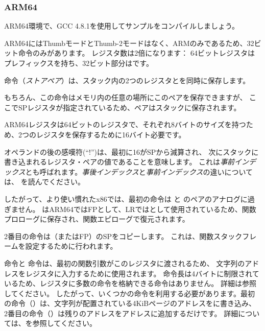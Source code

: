 ﻿\subsubsection{ARM64}


ARM64環境で、GCC 4.8.1を使用してサンプルをコンパイルしましょう。



ARM64にはThumbモードとThumb-2モードはなく、ARMのみであるため、32ビット命令のみがあります。
レジスタ数は2倍になります：
64ビットレジスタはプレフィックスを持ち、32ビット部分はです。

命令（\emph{ストアペア}）は、スタック内の2つのレジスタとを同時に保存します。

もちろん、この命令はメモリ内の任意の場所にこのペアを保存できますが、
ここで\ac{SP}レジスタが指定されているため、ペアはスタックに保存されます。

ARM64レジスタは64ビットのレジスタで、それぞれ8バイトのサイズを持つため、2つのレジスタを保存するために16バイト必要です。

オペランドの後の感嘆符(``!'')は、最初に16が\ac{SP}から減算され、
次にスタックに書き込まれるレジスタ・ペアの値であることを意味します。
これは\emph{事前インデックス}とも呼ばれます。\emph{事後インデックス}と\emph{事前インデックス}の違いについては、
 を読んでください。

したがって、より使い慣れたx86では、最初の命令は と のペアのアナログに過ぎません。
はARM64では\ac{FP}として、\ac{LR}ではとして使用されているため、関数プロローグに保存され、関数エピローグで復元されます。

2番目の命令は（または\ac{FP}）の\ac{SP}をコピーします。
これは、関数スタックフレームを設定するために行われます。

\label{pointers_ADRP_and_ADD}
命令と \ADD 命令は、最初の関数引数がこのレジスタに渡されるため、
文字列のアドレスをレジスタに入力するために使用されます。
命令長は4バイトに制限されているため、レジスタに多数の命令を格納できる命令はありません。
詳細は参照してください。
したがって、いくつかの命令を利用する必要があります。最初の命令（）は、文字列が配置されている4KiBページのアドレスをに書き込み、
2番目の命令（\ADD）は残りのアドレスをアドレスに追加するだけです。
詳細については、を参照してください。

